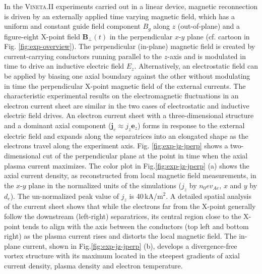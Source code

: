 \documentclass[aip,preprint]{revtex4-1}
\begin{document}
In the \textsc{Vineta}.II experiments \cite{stechow2016} carried out in a linear device, magnetic reconnection is driven by an externally applied time varying magnetic field, which has a uniform and constant guide field component $B_{g}$ along $z$ (out-of-plane) and a figure-eight X-point field $\mathbf{B}_{\perp}(t)$ in the perpendicular $x$-$y$ plane (cf. cartoon in Fig. \ref{fig:exp-overview}). The perpendicular (in-plane) magnetic field is created by current-carrying conductors running parallel to the $z$-axis and is modulated in time to drive an inductive electric field $E_z$. Alternatively, an electrostatic field can be applied by biasing one axial boundary against the other without modulating in time  the perpendicular X-point magnetic field of the external currents. The characteristic experimental results on the electromagnetic fluctuations in an electron current sheet are similar in the two cases of electrostatic and inductive electric field drives.
An electron current sheet with a three-dimensional structure and a dominant axial component ($\mathbf{j}_{e}\approx j_{z}\mathbf{e}_z$)
forms in response to the external electric field and expands along the separatrices into an elongated shape as the electrons travel along the experiment axis. Fig. \ref{fig:exp-jz-jperp} shows a two-dimensional cut of the perpendicular plane at the point in time when the axial plasma current maximizes. The color plot in Fig.\ref{fig:exp-jz-jperp} (a) shows the axial current density, as reconstructed from local magnetic field measurements, in the $x$-$y$ plane in the normalized units of the simulations ($j_z$ by $n_0ev_{Ae}$, $x$ and $y$ by $d_e$).
 The un-normalized peak value of $j_z$ is 40\,kA/m$^2$. %
A detailed spatial analysis of the current sheet shows that while the electrons far from the X-point generally follow the downstream (left-right) separatrices, 
its central region close to the X-point tends to align with the axis between the conductors (top left and bottom right) as the plasma current rises and distorts the local magnetic field. The in-plane current, shown in Fig.\ref{fig:exp-jz-jperp} (b), develops a divergence-free vortex structure with its maximum located in the steepest gradients of axial current density, plasma density and electron temperature.
\end{document}
